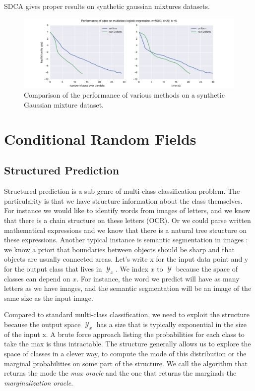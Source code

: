 \documentclass{article}
\DeclareMathOperator{\1}{\mathbb{1}}
\DeclareMathOperator{\Y}{\mathcal{Y}}
\begin{document}
SDCA gives proper results on synthetic gaussian mixtures datasets. 
\begin{figure}[ht]
	\label{gmm results}
	\includegraphics[width=\textwidth]{images/nonuniform_is_better.pdf}
	\caption{Comparison of the performance of various methods on a synthetic Gaussian mixture dataset.}
\end{figure}



\clearpage
\section{Conditional Random Fields}

\subsection{Structured Prediction}

Structured prediction is a sub genre of multi-class classification problem.
The particularity is that we have structure information about the class themselves.
For instance we would like to identify words from images of letters, and we know that there is a chain structure on these letters (OCR).
Or we could parse written mathematical expressions and we know that there is a natural tree structure on these expressions.
Another typical instance is semantic segmentation in images : we know a priori that boundaries between objects should be sharp and that objects are usually connected areas.
Let's write x for the input data point and y for the output class that lives in $\Y_x$.
We index $x$ to $\Y$ because the space of classes can depend on $x$.
For instance, the word we predict will have as many letters as we have images, and the semantic segmentation will be an image of the same size as the input image. 

Compared to standard multi-class classification, we need to exploit the structure because the output space $\Y_x$ has a size that is typically exponential in the size of the input x.
A brute force approach listing the probabilities for each class to take the max is thus intractable.
The structure generally allows us to explore the space of classes in a clever way, to compute the mode of this distribution or the marginal probabilities on some part of the structure.
We call the algorithm that returns the mode the \textit{max oracle} and the one that returns the marginals the \textit{marginalization oracle}. 
\end{document}
